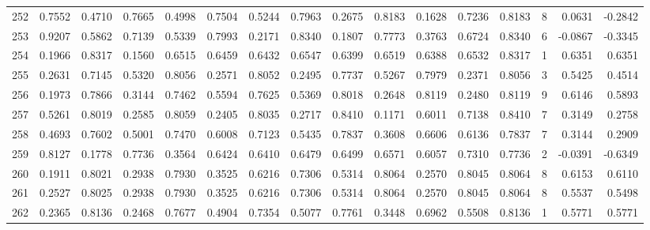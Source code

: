 \begin{tabular}{lrrrrrrrrrrrrrrr}
252 &      0.7552 &  0.4710 &  0.7665 &  0.4998 &  0.7504 &  0.5244 &  0.7963 &  0.2675 &  0.8183 &  0.1628 &   0.7236 &     0.8183 &      8 &                    0.0631 &                    -0.2842 \\
253 &      0.9207 &  0.5862 &  0.7139 &  0.5339 &  0.7993 &  0.2171 &  0.8340 &  0.1807 &  0.7773 &  0.3763 &   0.6724 &     0.8340 &      6 &                   -0.0867 &                    -0.3345 \\
254 &      0.1966 &  0.8317 &  0.1560 &  0.6515 &  0.6459 &  0.6432 &  0.6547 &  0.6399 &  0.6519 &  0.6388 &   0.6532 &     0.8317 &      1 &                    0.6351 &                     0.6351 \\
255 &      0.2631 &  0.7145 &  0.5320 &  0.8056 &  0.2571 &  0.8052 &  0.2495 &  0.7737 &  0.5267 &  0.7979 &   0.2371 &     0.8056 &      3 &                    0.5425 &                     0.4514 \\
256 &      0.1973 &  0.7866 &  0.3144 &  0.7462 &  0.5594 &  0.7625 &  0.5369 &  0.8018 &  0.2648 &  0.8119 &   0.2480 &     0.8119 &      9 &                    0.6146 &                     0.5893 \\
257 &      0.5261 &  0.8019 &  0.2585 &  0.8059 &  0.2405 &  0.8035 &  0.2717 &  0.8410 &  0.1171 &  0.6011 &   0.7138 &     0.8410 &      7 &                    0.3149 &                     0.2758 \\
258 &      0.4693 &  0.7602 &  0.5001 &  0.7470 &  0.6008 &  0.7123 &  0.5435 &  0.7837 &  0.3608 &  0.6606 &   0.6136 &     0.7837 &      7 &                    0.3144 &                     0.2909 \\
259 &      0.8127 &  0.1778 &  0.7736 &  0.3564 &  0.6424 &  0.6410 &  0.6479 &  0.6499 &  0.6571 &  0.6057 &   0.7310 &     0.7736 &      2 &                   -0.0391 &                    -0.6349 \\
260 &      0.1911 &  0.8021 &  0.2938 &  0.7930 &  0.3525 &  0.6216 &  0.7306 &  0.5314 &  0.8064 &  0.2570 &   0.8045 &     0.8064 &      8 &                    0.6153 &                     0.6110 \\
261 &      0.2527 &  0.8025 &  0.2938 &  0.7930 &  0.3525 &  0.6216 &  0.7306 &  0.5314 &  0.8064 &  0.2570 &   0.8045 &     0.8064 &      8 &                    0.5537 &                     0.5498 \\
262 &      0.2365 &  0.8136 &  0.2468 &  0.7677 &  0.4904 &  0.7354 &  0.5077 &  0.7761 &  0.3448 &  0.6962 &   0.5508 &     0.8136 &      1 &                    0.5771 &                     0.5771 \\

\end{tabular}
